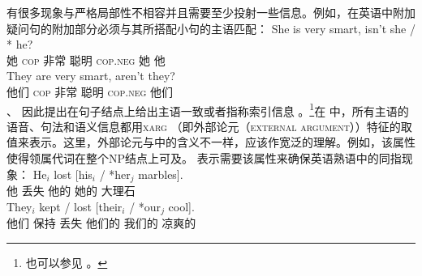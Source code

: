 有很多现象与严格局部性不相容并且需要至少投射一些信息。例如，在英语中附加疑问句的附加部分必须与其所搭配小句的主语匹配：
\eal
\ex 
\gll She is very smart, isn't she / * he?\\
     她 \textsc{cop} 非常 聪明 \textsc{cop}.\textsc{neg} 她 {} {} 他\\
\ex 
\gll They are very smart, aren't they?\\
     他们 \textsc{cop} 非常 聪明 \textsc{cop}.\textsc{neg} 他们\\
\zl
 \citet{BF99a}、 \citet{FB2003a}因此提出在句子结点上给出主语一致或者指称索引信息 。\footnote{%
  也可以参见 。
}在 \citet{Sag2007a}中，所有主语的语音、句法和语义信息都用\textsc{xarg} （即外部论元（\textsc{external argument}））特征的取值来表示。这里，外部论元与\gbtc 中的含义不一样，应该作宽泛的理解。例如，该属性使得领属代词在整个NP结点上可及。 \citet{Sag2007a}表示需要该属性来确保英语熟语中的同指现象：
\eal
\ex 
\gll He$_i$ lost [his$_i$ / *her$_j$ marbles].\\
     他      丢失 \spacebr{}他的 {} 她的 大理石\\
\ex 
\gll They$_i$ kept / lost [their$_i$ / *our$_j$ cool].\\
     他们     保持  {} 丢失 \spacebr{}他们的 {} 我们的 凉爽的\\
